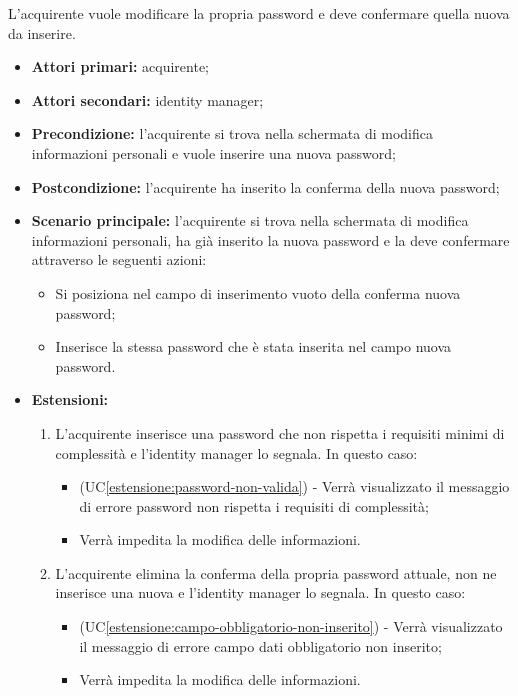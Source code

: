 \label{modifica-informazioni-acquirente.password.conferma-nuova-password}

L'acquirente vuole modificare la propria password e deve confermare quella nuova da inserire.
\begin{itemize}
    \item \textbf{Attori primari:} acquirente;
    \item \textbf{Attori secondari:} identity manager;
    \item \textbf{Precondizione:} l'acquirente si trova nella schermata di modifica informazioni personali e vuole inserire una nuova password;
    \item \textbf{Postcondizione:} l'acquirente ha inserito la conferma della nuova password;
    \item \textbf{Scenario principale:} l'acquirente si trova nella schermata di modifica informazioni personali, ha già inserito la nuova password e la deve confermare attraverso le seguenti azioni:
    \begin{itemize}
        \item Si posiziona nel campo di inserimento vuoto della conferma nuova password;
        \item Inserisce la stessa password che è stata inserita nel campo nuova password.
    \end{itemize}
    \item \textbf{Estensioni:}
    \begin{enumerate}[label=\lett]
        \item L'acquirente inserisce una password che non rispetta i requisiti minimi di complessità e l'identity manager lo segnala. In questo caso:
        \begin{itemize}
            \item (UC\ref{estensione:password-non-valida}) - Verrà visualizzato il messaggio di errore password non rispetta i requisiti di complessità;
            \item Verrà impedita la modifica delle informazioni.
        \end{itemize}
        \item L'acquirente elimina la conferma della propria password attuale, non ne inserisce una nuova e l'identity manager lo segnala. In questo caso:
        \begin{itemize}
            \item (UC\ref{estensione:campo-obbligatorio-non-inserito}) - Verrà visualizzato il messaggio di errore campo dati obbligatorio non inserito;
            \item Verrà impedita la modifica delle informazioni.
        \end{itemize}
    \end{enumerate}
\end{itemize}

